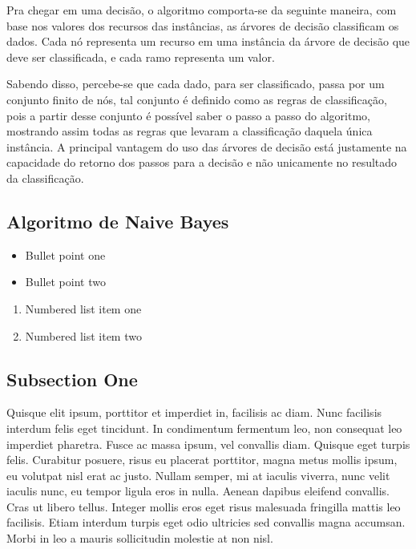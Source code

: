 \documentclass[preprint,12pt]{elsarticle}
\begin{document}
	Pra chegar em uma decis\~ao, o algoritmo comporta-se da seguinte maneira, com base nos valores dos recursos das inst\^ancias, as \'arvores de decis\~ao classificam os dados. Cada n\'o representa um recurso em uma inst\^ancia da \'arvore de decis\~ao que deve ser classificada, e cada ramo representa um valor\cite{Pandya:2015}.

	Sabendo disso, percebe-se que cada dado, para ser classificado, passa por um conjunto finito de n\'os, tal conjunto \'e definido como as regras de classifica\c c\~ao, pois a partir desse conjunto \'e poss\'ivel saber o passo a passo do algoritmo, mostrando assim todas as regras que levaram a classifica\c c\~ao daquela \'unica inst\^ancia. A principal vantagem do uso das \'arvores de decis\~ao est\'a justamente na capacidade do retorno dos passos para a decis\~ao e n\~ao unicamente no resultado da classifica\c c\~ao.

	\subsection{Algoritmo de Naive Bayes}



	\begin{itemize}
		\item Bullet point one
		\item Bullet point two
	\end{itemize}

	\begin{enumerate}
		\item Numbered list item one
		\item Numbered list item two
	\end{enumerate}

	\subsection{Subsection One}

	Quisque elit ipsum, porttitor et imperdiet in, facilisis ac diam. Nunc facilisis interdum felis eget tincidunt. In condimentum fermentum leo, non consequat leo imperdiet pharetra. Fusce ac massa ipsum, vel convallis diam. Quisque eget turpis felis. Curabitur posuere, risus eu placerat porttitor, magna metus mollis ipsum, eu volutpat nisl erat ac justo. Nullam semper, mi at iaculis viverra, nunc velit iaculis nunc, eu tempor ligula eros in nulla. Aenean dapibus eleifend convallis. Cras ut libero tellus. Integer mollis eros eget risus malesuada fringilla mattis leo facilisis. Etiam interdum turpis eget odio ultricies sed convallis magna accumsan. Morbi in leo a mauris sollicitudin molestie at non nisl.
\end{document}

